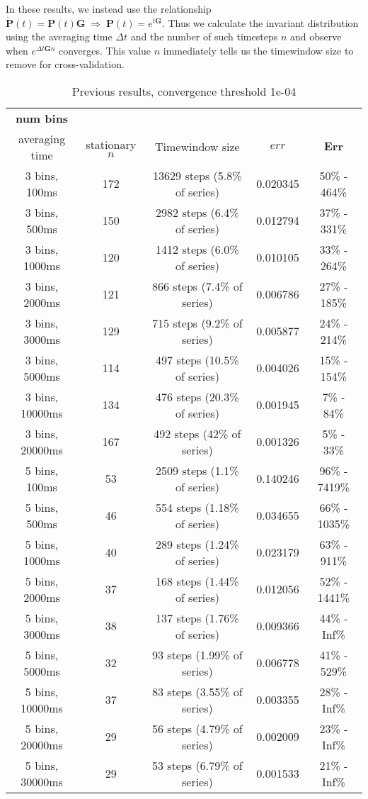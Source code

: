 \documentclass[12pt]{article}
\newcommand\mat[1]{\boldsymbol{#1}}
\begin{document}
In these results, we instead use the relationship $\dot{\mat{P}} (t) = \mat{P}(t)\mat{G} \; \Rightarrow \; \mat{P}(t) = e^{t\mat{G}}$. Thus we calculate the invariant distribution using the averaging time $\Delta t$ and the number of such timesteps $n$ and observe when $e^{\Delta t\mat{G}n}$ converges. This value $n$ immediately tells us the timewindow size to remove for cross-validation.

\begin{table}[H]
\small
\centering
\caption{Previous results, convergence threshold 1e-04}
\vspace*{2.5mm}
\begin{tabular}{c|c|c|c|c}
\hline
\bf num bins & & & & \\ averaging time & stationary $n$ & Timewindow size & $err$ & $\mat{Err}$ \\
\hline\hline
3 bins, 100ms & 172 & 13629 steps (5.8\% of series) & 0.020345 & 50\% - 464\% \\
\hline
3 bins, 500ms & 150 & 2982 steps (6.4\% of series) & 0.012794 & 37\% - 331\% \\
\hline
3 bins, 1000ms & 120 & 1412 steps (6.0\% of series) & 0.010105 & 33\% - 264\% \\
\hline
3 bins, 2000ms & 121 & 866 steps (7.4\% of series) & 0.006786 & 27\% - 185\% \\
\hline
3 bins, 3000ms & 129 & 715 steps (9.2\% of series) & 0.005877 & 24\% - 214\% \\
\hline
3 bins, 5000ms & 114 & 497 steps (10.5\% of series) & 0.004026 & 15\% - 154\% \\
\hline
3 bins, 10000ms & 134 & 476 steps (20.3\% of series) & 0.001945 & 7\% - 84\% \\
\hline
3 bins, 20000ms & 167 & 492 steps (42\% of series) & 0.001326 & 5\% - 33\% \\
\hline
\hline
5 bins, 100ms & 53 & 2509 steps (1.1\% of series) & 0.140246 & 96\% - 7419\% \\
\hline
5 bins, 500ms & 46 & 554 steps (1.18\% of series) & 0.034655 & 66\% - 1035\% \\
\hline
5 bins, 1000ms & 40 & 289 steps (1.24\% of series) & 0.023179 & 63\% - 911\% \\
\hline
5 bins, 2000ms & 37 & 168 steps (1.44\% of series)  & 0.012056 & 52\% - 1441\% \\
\hline
5 bins, 3000ms & 38 & 137 steps (1.76\% of series) &  0.009366 & 44\% - Inf\% \\
\hline
5 bins, 5000ms & 32 & 93 steps (1.99\% of series) & 0.006778 & 41\% - 529\% \\
\hline
5 bins, 10000ms & 37 & 83 steps (3.55\% of series) & 0.003355 & 28\% - Inf\% \\
\hline
5 bins, 20000ms & 29 & 56 steps (4.79\% of series) & 0.002009 & 23\% - Inf\% \\
\hline
5 bins, 30000ms & 29 & 53 steps (6.79\% of series) & 0.001533 & 21\% - Inf\% \\
\hline
\end{tabular}
\end{table}
\end{document}
